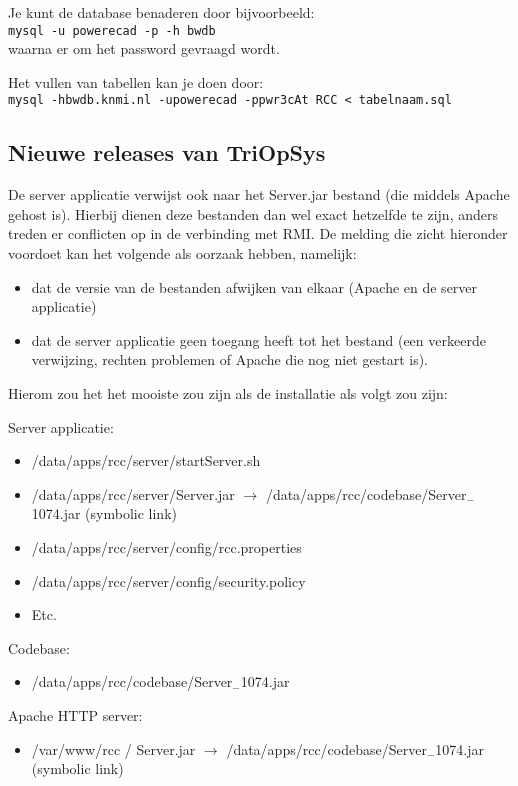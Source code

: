 \documentclass{article}
\begin{document}
\noindent
Je kunt de database benaderen door bijvoorbeeld:\\
\texttt{mysql -u powerecad -p -h bwdb}\\
waarna er om het password gevraagd wordt.

\noindent
Het vullen van tabellen kan je doen door:\\
\texttt{mysql -hbwdb.knmi.nl -upowerecad -ppwr3cAt RCC < tabelnaam.sql}

\subsection*{Nieuwe releases van TriOpSys}
De server applicatie verwijst ook naar het Server.jar bestand (die middels Apache gehost is). Hierbij dienen 
deze bestanden dan wel exact hetzelfde te zijn, anders treden er conflicten op in de verbinding met RMI. 
De melding die zicht hieronder voordoet kan het volgende als oorzaak hebben, namelijk:
\begin{itemize}
\item dat de versie van de bestanden afwijken van elkaar (Apache en de server applicatie)
\item dat de server applicatie geen toegang heeft tot het bestand (een verkeerde verwijzing, rechten problemen 
of Apache die nog niet gestart is).
\end{itemize}

Hierom zou het het mooiste zou zijn als de installatie als volgt zou zijn:

Server applicatie:
\begin{itemize}
\item   /data/apps/rcc/server/startServer.sh
\item   /data/apps/rcc/server/Server.jar $\rightarrow$ /data/apps/rcc/codebase/Server$_-$1074.jar (symbolic link)
\item   /data/apps/rcc/server/config/rcc.properties
\item   /data/apps/rcc/server/config/security.policy
\item   Etc.
\end{itemize}

Codebase:
\begin{itemize}
\item  /data/apps/rcc/codebase/Server$_-$1074.jar
\end{itemize}

Apache HTTP server:
\begin{itemize}
\item  /var/www/rcc / Server.jar $\rightarrow$ /data/apps/rcc/codebase/Server$_-$1074.jar (symbolic link)
\end{itemize}
\end{document}
